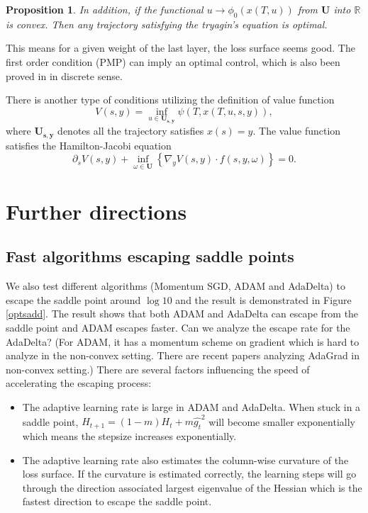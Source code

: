 \documentclass{article}
\theoremstyle{plain}
\newtheorem{prop}{Proposition}
\theoremstyle{definition}
\begin{document}
\begin{prop}
    In addition, if the functional $u\rightarrow \phi_0(x(T,u))$ from $\mathbf{U}$ into $\mathbb{R}$ is convex. Then any trajectory satisfying the tryagin's equation is optimal.
\end{prop}

This means for a given weight of the last layer, the loss surface seems good. The first order condition (PMP) can imply an optimal control, which is also been proved in \cite{bartlett2018representing} in discrete sense.

There is another type of conditions utilizing the definition of value function
$$V(s,y)=\inf_{u\in\mathbf{U_{s,y}}}\psi(T,x(T,u,s,y)),$$
where $\mathbf{U_{s,y}}$ denotes all the trajectory satisfies $x(s)=y$. The value function satisfies the Hamilton-Jacobi equation $$\partial_sV(s,y)+\inf_{\omega\in\mathbf{U}}\left\{\nabla_yV(s,y)\cdot f(s,y,\omega)\right\}=0.$$

\section{Further directions}

\subsection{Fast algorithms escaping saddle points}

We also test different algorithms (Momentum SGD, ADAM and AdaDelta) to escape the saddle point around $\log 10$ and the result is demonstrated in Figure \ref{optsadd}. The result shows that both ADAM and AdaDelta can escape from the saddle point and ADAM escapes faster. Can we analyze the escape rate for the AdaDelta? (For ADAM, it has a momentum scheme on gradient which is hard to analyze in the non-convex setting. There are recent papers analyzing AdaGrad in non-convex setting.) There are several factors influencing the speed of accelerating the escaping process:

\begin{itemize}
    \item The adaptive learning rate is large in ADAM and AdaDelta. When stuck in a saddle point, $H_{t+1}=(1-m)H_t+m\hat{g_t}^2$ will become smaller exponentially which means the stepsize increases exponentially.
    \item The adaptive learning rate also estimates the column-wise curvature of the loss surface. If the curvature is estimated correctly, the learning steps will go through the direction associated largest eigenvalue of the Hessian which is the fastest direction to escape the saddle point.
\end{itemize}
\end{document}
